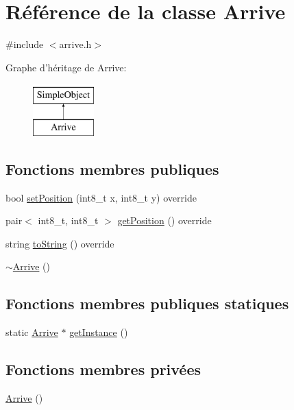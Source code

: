\hypertarget{classArrive}{\section{Référence de la classe Arrive}
\label{classArrive}
}


{\ttfamily \#include $<$arrive.\-h$>$}

Graphe d'héritage de Arrive\-:\begin{figure}[H]
\begin{center}
\leavevmode
\includegraphics[height=2.000000cm]{classArrive}
\end{center}
\end{figure}
\subsection*{Fonctions membres publiques}
\begin{DoxyCompactItemize}
\item 
bool \hyperlink{classArrive_ab0484a9338e3774c5fa824153b1470e2}{set\-Position} (int8\-\_\-t x, int8\-\_\-t y) override
\item 
pair$<$ int8\-\_\-t, int8\-\_\-t $>$ \hyperlink{classArrive_abe91e4a5bcf15ff987ab58c05b6bb537}{get\-Position} () override
\item 
string \hyperlink{classArrive_af97f0e7e0624cce7ca09d52675e19872}{to\-String} () override
\item 
\hyperlink{classArrive_a65994a8b59dad5bd69480fb85c07d72b}{$\sim$\-Arrive} ()
\end{DoxyCompactItemize}
\subsection*{Fonctions membres publiques statiques}
\begin{DoxyCompactItemize}
\item 
static \hyperlink{classArrive}{Arrive} $\ast$ \hyperlink{classArrive_a0614a2400b23b0ec86294d1776067df2}{get\-Instance} ()
\end{DoxyCompactItemize}
\subsection*{Fonctions membres privées}
\begin{DoxyCompactItemize}
\item 
\hyperlink{classArrive_a55dd55358bedefc3f0c82dd83fdfec79}{Arrive} ()
\end{DoxyCompactItemize}
